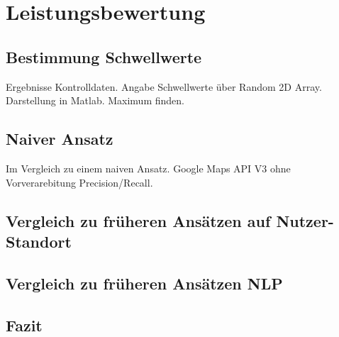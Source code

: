 \chapter{Leistungsbewertung} 


	\section{Bestimmung Schwellwerte} 
		
		Ergebnisse Kontrolldaten.
		Angabe Schwellwerte über Random 2D Array. 
		Darstellung in Matlab.
		Maximum finden. 

	\section{Naiver Ansatz}
		
		Im Vergleich zu einem naiven Ansatz.
		Google Maps API V3 ohne Vorverarebitung 
		Precision/Recall. 


	\section{Vergleich zu früheren Ansätzen auf Nutzer-Standort}
		

	\section{Vergleich zu früheren Ansätzen NLP}
		

	\section{Fazit}   

